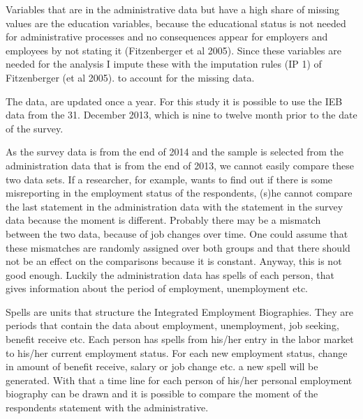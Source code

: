 Variables that are in the administrative data but have a high share of missing values are the education variables, because the educational status is not needed for administrative processes and no consequences appear for employers and employees by not stating it (Fitzenberger et al 2005). Since these variables are needed for the analysis I impute these with the imputation rules (IP 1) of Fitzenberger (et al 2005). to account for the missing data.

The data, are updated once a year. For this study it is possible to use the IEB data from the 31. December 2013, which is nine to twelve month prior to the date of the survey.

As the survey data is from the end of 2014 and the sample is selected from the administration data that is from the end of 2013, we cannot easily compare these two data sets. If a researcher, for example, wants to find out if there is some misreporting in the employment status of the respondents, (s)he cannot compare the last statement in the administration data with the statement in the survey data because the moment is different. Probably there may be a mismatch between the two data, because of job changes over time. One could assume that these mismatches are randomly assigned over both groups and that there should not be an effect on the comparisons because it is constant. Anyway, this is not good enough. Luckily the administration data has spells of each person, that gives information about the period of employment, unemployment etc.

Spells are units that structure the Integrated Employment Biographies. They are periods that contain the data about employment, unemployment, job seeking, benefit receive etc. Each person has spells from his/her entry in the labor market to his/her current employment status. For each new employment status, change in amount of benefit receive, salary or job change etc. a new spell will be generated. With that a time line for each person of his/her personal employment biography can be drawn and it is possible to compare the moment of the respondents statement with the administrative.

